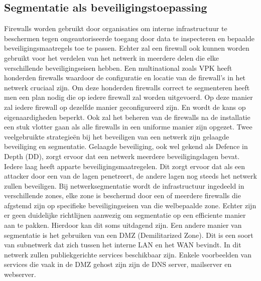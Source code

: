 \subsection{Segmentatie als beveiligingstoepassing}
Firewalls worden gebruikt door organisaties om interne infrastructuur te beschermen tegen ongeautoriseerde toegang door data te inspecteren en bepaalde beveiligingsmaatregels toe te passen. Echter zal een firewall ook kunnen worden gebruikt voor het verdelen van het netwerk in meerdere delen die elke verschillende beveiligingseisen hebben. Een multinational zoals VPK heeft honderden firewalls waardoor de configuratie en locatie van de firewall’s in het netwerk cruciaal zijn. Om deze honderden firewalls correct te segmenteren heeft men een plan nodig die op iedere firewall zal worden uitgevoerd. Op deze manier zal iedere firewall op dezelfde manier geconfigureerd zijn. En wordt de kans op eigenaardigheden beperkt. Ook zal het beheren van de firewalls na de installatie een stuk vlotter gaan als alle firewalls in een uniforme manier zijn opgezet.
Twee veelgebruikte strategieën bij het beveiligen van een netwerk zijn gelaagde beveiliging en segmentatie. Gelaagde beveiliging, ook wel gekend als Defence in Depth (DD), zorgt ervoor dat een netwerk meerdere beveiligingslagen bevat. Iedere laag heeft apparte beveiligingsmaatregelen. Dit zorgt ervoor dat als een attacker door een van de lagen penetreert, de andere lagen nog steeds het netwerk zullen beveiligen. \autocite{FortinetDE2025} Bij netwerksegmentatie wordt de infrastructuur ingedeeld in verschillende zones, elke zone is beschermd door een of meerdere firewalls die afgstemd zijn op specifieke beveiligingseisen van die welbepaalde zone. Echter zijn er geen duidelijke richtlijnen aanwezig om segmentatie op een efficiente manier aan te pakken. Hierdoor kan dit soms uitdagend zijn. \autocite{Mhaskar2021}
Een andere manier van segmentatie is het gebruiken van een DMZ (Demilitarized Zone). Dit is een soort van subnetwerk dat zich tussen het interne LAN en het WAN bevindt. In dit netwerk zullen publiekgerichte services beschikbaar zijn. Enkele voorbeelden van services die vaak in de DMZ gehost zijn zijn de DNS server, mailserver en webserver. \autocite{Patel2020}














